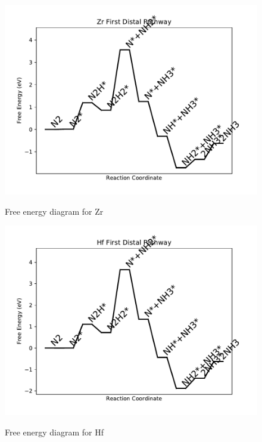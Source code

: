 \documentclass{article}
\begin{document}
\begin{figure}
\includegraphics[width=1\linewidth]{data/plots/Zr_distal_1.pdf}
\label{fig:Zr_distal_1}
\caption{Free energy diagram for Zr}
\end{figure}

\clearpage
\begin{figure}
\includegraphics[width=1\linewidth]{data/plots/Hf_distal_1.pdf}
\label{fig:Hf_distal_1}
\caption{Free energy diagram for Hf}
\end{figure}
\end{document}

